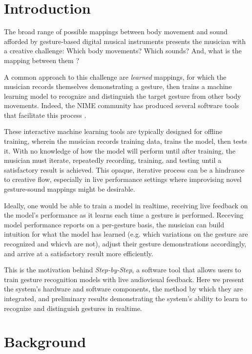 \documentclass{nime-alternate} %
\begin{document}
\section{Introduction}
The broad range of possible mappings between body movement and sound afforded by gesture-based digital musical instruments presents the musician with a creative challenge: Which body movements? Which sounds? And, what is the mapping between them \cite{mitchell:mapping}?

A common approach to this challenge are \textit{learned} mappings, for which the musician records themselves demonstrating a gesture, then trains a machine learning model to recognize and distinguish the target gesture from other body movements. Indeed, the NIME community has produced several software tools that facilitate this process \cite{bullock:mllib,fiebrink:wekinator, gillian:toolkit, caramiaux:nimeml, mcpherson:pipeline}.

These interactive machine learning tools are typically designed for offline training, wherein the musician records training data, trains the model, then tests it. With no knowledge of how the model will perform until after training, the musician must iterate, repeatedly recording, training, and testing until a satisfactory result is achieved. This opaque, iterative process can be a hindrance to creative flow, especially in live performance settings where improvising novel gesture-sound mappings might be desirable.

Ideally, one would be able to train a model in realtime, receiving live feedback on the model's performance as it learns each time a gesture is performed. Receving model performance reports on a per-gesture basis, the musician can build intuition for what the model has learned (e.g. which variations on the gesture are recognized and whicvh are not), adjust their gesture demonstrations accordingly, and arrive at a satisfactory result more efficiently.

This is the motivation behind \textit{Step-by-Step}, a software tool that allows users to train gesture recognition models with live audiovisual feedback. Here we present the system's hardware and software components, the method by which they are integrated, and preliminary results demonstrating the system's ability to learn to recognize and distinguish gestures in realtime.

\section{Background}
\end{document}
